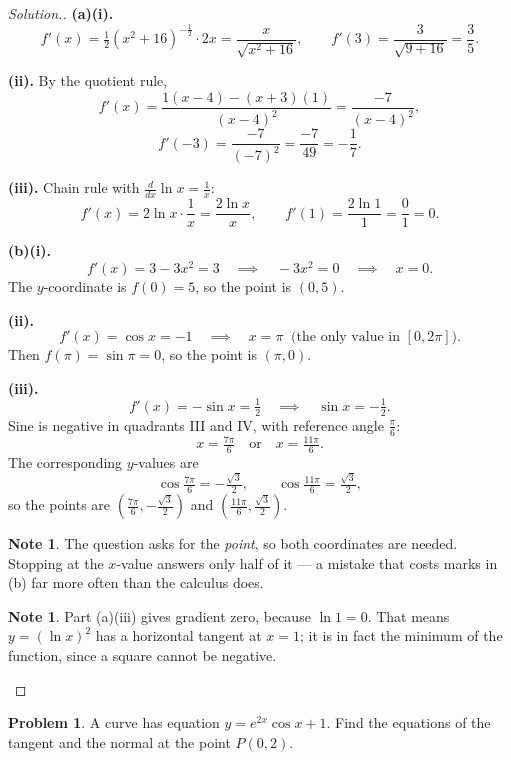 \documentclass[11pt,a4paper]{article}
\theoremstyle{definition}
\newtheorem{note}[thm]{Note}
\newtheorem{problemx}{Problem}[section]
\newenvironment{problem}{\begin{problemx}}{\end{problemx}}
\newenvironment{solution}
  {\renewcommand{\qedsymbol}{}\begin{proof}[\textit{Solution}.]}
  {\end{proof}}
\begin{document}
\begin{solution}
\textbf{(a)(i).}
$$f'(x)=\tfrac{1}{2}\left(x^2+16\right)^{-\frac{1}{2}}\cdot 2x
=\frac{x}{\sqrt{x^2+16}},\qquad
f'(3)=\frac{3}{\sqrt{9+16}}=\frac{3}{5}.$$

\textbf{(ii).} By the quotient rule,
$$f'(x)=\frac{1(x-4)-(x+3)(1)}{(x-4)^2}=\frac{-7}{(x-4)^2},$$
$$f'(-3)=\frac{-7}{(-7)^2}=\frac{-7}{49}=-\frac{1}{7}.$$

\textbf{(iii).} Chain rule with $\frac{d}{dx}\ln x=\frac{1}{x}$:
$$f'(x)=2\ln x\cdot\frac{1}{x}=\frac{2\ln x}{x},\qquad
f'(1)=\frac{2\ln 1}{1}=\frac{0}{1}=0.$$

\textbf{(b)(i).}
$$f'(x)=3-3x^2=3\quad\implies\quad -3x^2=0\quad\implies\quad x=0.$$
The $y$-coordinate is $f(0)=5$, so the point is $(0,5)$.

\textbf{(ii).}
$$f'(x)=\cos x=-1\quad\implies\quad x=\pi\ \text{ (the only value in } [0,2\pi]).$$
Then $f(\pi)=\sin\pi=0$, so the point is $(\pi,0)$.

\textbf{(iii).}
$$f'(x)=-\sin x=\tfrac{1}{2}\quad\implies\quad \sin x=-\tfrac{1}{2}.$$
Sine is negative in quadrants III and IV, with reference angle $\frac{\pi}{6}$:
$$x=\tfrac{7\pi}{6}\quad\text{or}\quad x=\tfrac{11\pi}{6}.$$
The corresponding $y$-values are
$$\cos\tfrac{7\pi}{6}=-\tfrac{\sqrt{3}}{2},\qquad
\cos\tfrac{11\pi}{6}=\tfrac{\sqrt{3}}{2},$$
so the points are
$\left(\frac{7\pi}{6},-\frac{\sqrt{3}}{2}\right)$ and
$\left(\frac{11\pi}{6},\frac{\sqrt{3}}{2}\right)$.

\begin{note}
The question asks for the \emph{point}, so both coordinates are needed. Stopping at the
$x$-value answers only half of it --- a mistake that costs marks in (b) far more often
than the calculus does.
\end{note}

\begin{note}
Part (a)(iii) gives gradient zero, because $\ln 1=0$. That means $y=(\ln x)^2$ has a
horizontal tangent at $x=1$; it is in fact the minimum of the function, since a square
cannot be negative.
\end{note}
\end{solution}

\begin{problem}
A curve has equation $y=e^{2x}\cos x+1$. Find the equations of the tangent and the
normal at the point $P(0,2)$.
\end{problem}
\end{document}
